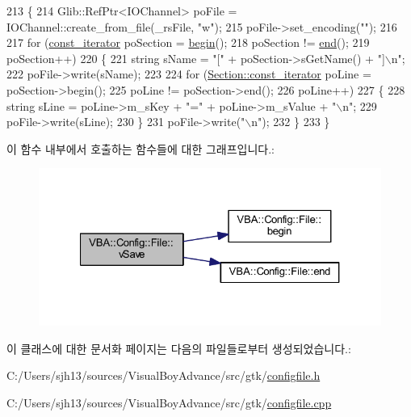 \begin{DoxyCode}
213 \{
214   Glib::RefPtr<IOChannel> poFile = IOChannel::create\_from\_file(\_rsFile, \textcolor{stringliteral}{"w"});
215   poFile->set\_encoding(\textcolor{stringliteral}{""});
216 
217   \textcolor{keywordflow}{for} (\mbox{\hyperlink{class_v_b_a_1_1_config_1_1_file_a3c4cd2c1e02bbe2dfff43c4e89c71edb}{const\_iterator}} poSection = \mbox{\hyperlink{class_v_b_a_1_1_config_1_1_file_a4dd88e6aa71829ce332139028225efcf}{begin}}();
218        poSection != \mbox{\hyperlink{class_v_b_a_1_1_config_1_1_file_a809724e386bf59c8726c33e822890c70}{end}}();
219        poSection++)
220   \{
221     \textcolor{keywordtype}{string} sName = \textcolor{stringliteral}{"["} + poSection->sGetName() + \textcolor{stringliteral}{"]\(\backslash\)n"};
222     poFile->write(sName);
223 
224     \textcolor{keywordflow}{for} (\mbox{\hyperlink{class_v_b_a_1_1_config_1_1_section_a79d4303068448425b08175c0d2dacfab}{Section::const\_iterator}} poLine = poSection->begin();
225          poLine != poSection->end();
226          poLine++)
227     \{
228       \textcolor{keywordtype}{string} sLine = poLine->m\_sKey + \textcolor{stringliteral}{"="} + poLine->m\_sValue + \textcolor{stringliteral}{"\(\backslash\)n"};
229       poFile->write(sLine);
230     \}
231     poFile->write(\textcolor{stringliteral}{"\(\backslash\)n"});
232   \}
233 \}
\end{DoxyCode}
이 함수 내부에서 호출하는 함수들에 대한 그래프입니다.\+:
\nopagebreak
\begin{figure}[H]
\begin{center}
\leavevmode
\includegraphics[width=327pt]{class_v_b_a_1_1_config_1_1_file_a95ce8b60e20b58e730d9987843cba5a4_cgraph}
\end{center}
\end{figure}


이 클래스에 대한 문서화 페이지는 다음의 파일들로부터 생성되었습니다.\+:\begin{DoxyCompactItemize}
\item 
C\+:/\+Users/sjh13/sources/\+Visual\+Boy\+Advance/src/gtk/\mbox{\hyperlink{configfile_8h}{configfile.\+h}}\item 
C\+:/\+Users/sjh13/sources/\+Visual\+Boy\+Advance/src/gtk/\mbox{\hyperlink{configfile_8cpp}{configfile.\+cpp}}\end{DoxyCompactItemize}
